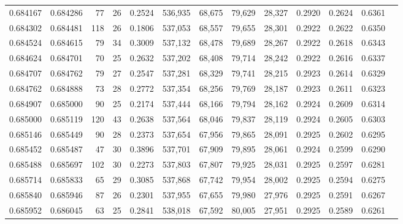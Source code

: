 \begin{tabular}{rrrrrrrrrrrrr}
0.684167 & 0.684286 &     77 &    26 &                                     0.2524 & 536,935 &  68,675 &  79,629 &  28,327 & 0.2920 & 0.2624 & 0.6361 \\
0.684302 & 0.684481 &    118 &    26 &                                     0.1806 & 537,053 &  68,557 &  79,655 &  28,301 & 0.2922 & 0.2622 & 0.6350 \\
0.684524 & 0.684615 &     79 &    34 &                                     0.3009 & 537,132 &  68,478 &  79,689 &  28,267 & 0.2922 & 0.2618 & 0.6343 \\
0.684624 & 0.684701 &     70 &    25 &                                     0.2632 & 537,202 &  68,408 &  79,714 &  28,242 & 0.2922 & 0.2616 & 0.6337 \\
0.684707 & 0.684762 &     79 &    27 &                                     0.2547 & 537,281 &  68,329 &  79,741 &  28,215 & 0.2923 & 0.2614 & 0.6329 \\
0.684762 & 0.684888 &     73 &    28 &                                     0.2772 & 537,354 &  68,256 &  79,769 &  28,187 & 0.2923 & 0.2611 & 0.6323 \\
0.684907 & 0.685000 &     90 &    25 &                                     0.2174 & 537,444 &  68,166 &  79,794 &  28,162 & 0.2924 & 0.2609 & 0.6314 \\
0.685000 & 0.685119 &    120 &    43 &                                     0.2638 & 537,564 &  68,046 &  79,837 &  28,119 & 0.2924 & 0.2605 & 0.6303 \\
0.685146 & 0.685449 &     90 &    28 &                                     0.2373 & 537,654 &  67,956 &  79,865 &  28,091 & 0.2925 & 0.2602 & 0.6295 \\
0.685452 & 0.685487 &     47 &    30 &                                     0.3896 & 537,701 &  67,909 &  79,895 &  28,061 & 0.2924 & 0.2599 & 0.6290 \\
0.685488 & 0.685697 &    102 &    30 &                                     0.2273 & 537,803 &  67,807 &  79,925 &  28,031 & 0.2925 & 0.2597 & 0.6281 \\
0.685714 & 0.685833 &     65 &    29 &                                     0.3085 & 537,868 &  67,742 &  79,954 &  28,002 & 0.2925 & 0.2594 & 0.6275 \\
0.685840 & 0.685946 &     87 &    26 &                                     0.2301 & 537,955 &  67,655 &  79,980 &  27,976 & 0.2925 & 0.2591 & 0.6267 \\
0.685952 & 0.686045 &     63 &    25 &                                     0.2841 & 538,018 &  67,592 &  80,005 &  27,951 & 0.2925 & 0.2589 & 0.6261 \\

\end{tabular}
